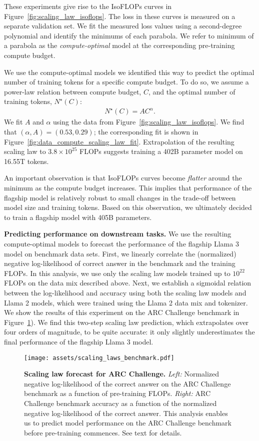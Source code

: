 These experiments give rise to the IsoFLOPs curves in Figure~\ref{fig:scaling_law_isoflops}.
The loss in these curves is measured on a separate validation set.
We fit the measured loss values using a second-degree polynomial and identify the minimums of each parabola.
We refer to minimum of a parabola as the \emph{compute-optimal} model at the corresponding pre-training compute budget.


We use the compute-optimal models we identified this way to predict the optimal number of training tokens for a specific compute budget.
To do so, we assume a power-law relation between compute budget, $C$, and the optimal number of training tokens, $N^\star(C)$:
\begin{align*}
    N^\star(C) = A C^\alpha.
\end{align*}
We fit $A$ and $\alpha$ using the data from Figure~\ref{fig:scaling_law_isoflops}.
We find that $(\alpha, A) = (0.53, 0.29)$; the corresponding fit is shown in Figure~\ref{fig:data_compute_scaling_law_fit}.
Extrapolation of the resulting scaling law to $3.8 \times 10^{25}$ FLOPs suggests training a
402B parameter model on 16.55T tokens.


An important observation is that IsoFLOPs curves become \emph{flatter} around the minimum as the compute budget increases.
This implies that performance of the flagship model is relatively robust to small changes in the trade-off between model size and training tokens.
Based on this observation, we ultimately decided to train a flagship model with 405B parameters.


\textbf{Predicting performance on downstream tasks.} We use the resulting compute-optimal models to forecast the performance of the flagship Llama 3 model on benchmark data sets. 
First, we linearly correlate the (normalized) negative log-likelihood of correct answer in the benchmark and the training FLOPs. In this analysis, we use only the scaling law models trained up to $10^{22}$ FLOPs on the data mix described above.
Next, we establish a sigmoidal relation between the log-likelihood and accuracy using both the scaling law models and Llama 2 models, which were trained using the Llama 2 data mix and tokenizer.
We show the results of this experiment on the ARC Challenge benchmark in Figure~\ref{fig:scaling_law_benchmarks}).
We find this two-step scaling law prediction, which extrapolates over four orders of magnitude, to be quite accurate: it only slightly underestimates the final performance of the flagship Llama 3 model.

\begin{figure}[tbp]
	\centering
	\texttt{[image: assets/scaling\_laws\_benchmark.pdf]}
	\caption{\textbf{Scaling law forecast for ARC Challenge.} \emph{Left:} Normalized negative log-likelihood of the correct answer on the ARC Challenge benchmark as a function of pre-training FLOPs.
	\emph{Right:} ARC Challenge benchmark accuracy as a function of the normalized negative log-likelihood of the correct answer. This analysis enables us to predict model performance on the ARC Challenge benchmark before pre-training commences. See text for details.}
	\label{fig:scaling_law_benchmarks}
\end{figure}
